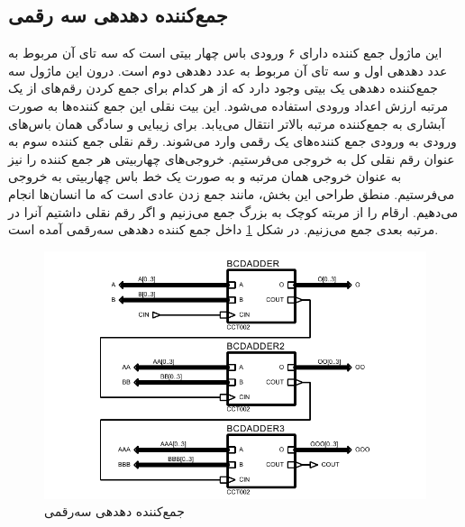 \documentclass{article}
\begin{document}
\subsection{جمع‌کننده دهدهی سه رقمی}
این ماژول جمع کننده دارای ۶ ورودی باس چهار بیتی است که سه‌ تای آن مربوط به عدد دهدهی اول و سه تای آن مربوط به عدد دهدهی دوم است. درون این ماژول سه جمع‌کننده دهدهی یک بیتی وجود دارد که از هر کدام برای جمع کردن رقم‌های از یک مرتبه ارزش اعداد ورودی استفاده می‌شود. این بیت نقلی این جمع کننده‌ها به صورت آبشاری به جمع‌کننده مرتبه بالاتر انتقال می‌یابد. برای زیبایی و سادگی همان باس‌های ورودی به ورودی جمع کننده‌های یک رقمی وارد می‌شوند. رقم نقلی جمع کننده سوم به عنوان رقم نقلی کل به خروجی می‌فرستیم. خروجی‌های چهاربیتی هر جمع کننده را نیز به عنوان خروجی همان مرتبه و به صورت یک خط باس چهاربیتی به خروجی ‌می‌فرستیم. منطق طراحی این بخش، مانند جمع زدن عادی است که ما انسان‌ها انجام می‌دهیم. ارقام را از مربته کوچک به بزرگ جمع می‌زنیم و اگر رقم نقلی داشتیم آنرا در مرتبه بعدی جمع می‌زنیم. در شکل \ref{fig:3bcd} داخل جمع کننده دهدهی سه‌رقمی آمده است.

\begin{figure}
	\centering
	\includegraphics[scale=0.7]{./captures/3bcd}
	\caption{جمع‌کننده دهدهی سه‌رقمی}
	\label{fig:3bcd}
\end{figure}
\end{document}

